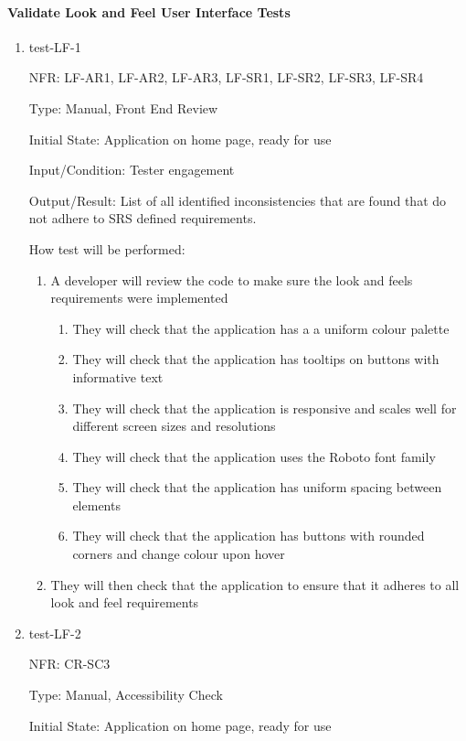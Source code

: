 \documentclass[12pt, titlepage]{article}
\begin{document}
\paragraph{Validate Look and Feel User Interface Tests}
\begin{enumerate}

\item{test-LF-1}

NFR: LF-AR1, LF-AR2, LF-AR3, LF-SR1, LF-SR2, LF-SR3, LF-SR4

Type: Manual, Front End Review
					
Initial State: Application on home page, ready for use
					
Input/Condition: Tester engagement
					
Output/Result: List of all identified inconsistencies that are found that do not adhere to SRS defined requirements.
					
How test will be performed: 
\begin{enumerate}
  \item A developer will review the code to make sure the look and feels requirements were implemented
  \begin{enumerate}
    \item They will check that the application has a a uniform colour palette
    \item They will check that the application has tooltips on buttons with informative text
    \item They will check that the application is responsive and scales well for different screen sizes and resolutions
    \item They will check that the application uses the Roboto font family
    \item They will check that the application has uniform spacing between elements
    \item They will check that the application has buttons with rounded corners and change colour upon hover
  \end{enumerate}
  \item They will then check that the application to ensure that it adheres to all look and feel requirements
\end{enumerate}

\item{test-LF-2}

NFR: CR-SC3

Type: Manual, Accessibility Check
					
Initial State: Application on home page, ready for use
					

\end{enumerate}
\end{document}
